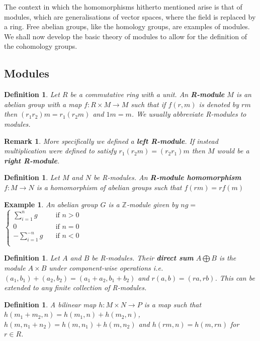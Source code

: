 \documentclass{article}
\newtheorem{definition}[theorem]{Definition}
\newtheorem{example}[theorem]{Example}
\newtheorem{remark}[theorem]{Remark}
\begin{document}
\noindent The context in which the homomorphisms hitherto mentioned arise is that of modules, which are generalisations of vector spaces, where the field is replaced by a ring. Free abelian groups, like the homology groups, are examples of modules. We shall now develop the basic theory of modules to allow for the definition of the cohomology groups.
\subsection{Modules}
\begin{definition}
Let $R$ be a commutative ring with a unit. An \textbf{R-module} $M$ is an abelian group with a map $f\colon R\times M\to M$ such that if $f(r,m)$ is denoted by $rm$ then $(r_1r_2)m=r_1(r_2m)$ and $1m=m$. We usually abbreviate R-modules to modules.
\end{definition}
\begin{remark}
More specifically we defined a \textbf{left R-module}. If instead multiplication were defined to satisfy $r_1(r_2m)=(r_2r_1)m$ then $M$ would be a \textbf{right R-module}.
\end{remark}

\begin{definition}
Let $M$ and $N$ be R-modules. An \textbf{R-module homomorphism} $f\colon M\to N$ is a homomorphism of abelian groups such that $f(rm)=rf(m)$ 
\end{definition}

\begin{example}
An abelian group $G$ is a $\mathbb{Z}$-module given by $ng=$$\begin{cases}
       \sum_{i=1}^ng &\quad\text{if }n>0 \\
       0 &\quad\text{if }n=0 \\
       -\sum_{i=1}^{-n}g &\quad\text{if }n<0 \\
     \end{cases}$\\
\end{example}

\begin{definition}
Let $A$ and $B$ be R-modules. Their \textbf{direct sum} $A\bigoplus B$ is the module $A\times B$ under component-wise operations i.e. $(a_1,b_1)+(a_2,b_2)=(a_1+a_2,b_1+b_2)$ and $r(a,b)=(ra,rb)$. This can be extended to any finite collection of R-modules.
\end{definition}

\begin{definition}
A bilinear map $h\colon M\times N\to P$ is a map such that $h(m_1+m_2,n)=h(m_1,n)+h(m_2,n)$, $h(m,n_1+n_2)=h(m,n_1)+h(m,n_2)$ and $h(rm,n)=h(m,rn)$ for $r\in R$.
\end{definition}
\end{document}
